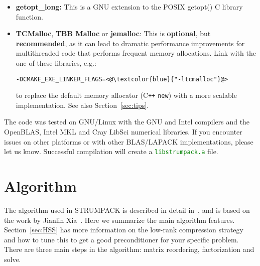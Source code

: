 \documentclass{article}
\newcommand{\tm}{\textsuperscript{\textregistered}}
\begin{document}
\begin{itemize}
\item \textbf{getopt\_long:} This is a GNU extension to the POSIX
  getopt() C library function.
\item \textbf{TCMalloc}, \textbf{TBB Malloc} or \textbf{jemalloc}:
  This is \textbf{optional}, but \textbf{recommended}, as it can lead
  to dramatic performance improvements for multithreaded code that
  performs frequent memory allocations. Link with the one of these
  libraries, e.g.:
  \begin{lstlisting}[style=Bash]
  -DCMAKE_EXE_LINKER_FLAGS=<@\textcolor{blue}{"-ltcmalloc"}@>
  \end{lstlisting}
  to replace the default memory allocator (C\texttt{++} \texttt{new})
  with a more scalable implementation. See also
  Section~\ref{sec:tips}.
\end{itemize}
The code was tested on GNU/Linux with the GNU and Intel\tm{} compilers
and the OpenBLAS, Intel\tm{} MKL\tm{} and Cray\tm{} LibSci\tm{}
numerical libraries. If you encounter issues on other platforms or
with other BLAS/LAPACK implementations, please let us know.
Successful compilation will create a
\textcolor{green}{\texttt{libstrumpack.a}} file.


\section{Algorithm}\label{sec:algo}
The algorithm used in STRUMPACK is described in detail
in~\cite{ghysels2015sparse}, and is based on the work by Jianlin
Xia~\cite{xia2013randomized}. Here we summarize the main algorithm
features. Section~\ref{sec:HSS} has more information on the low-rank
compression strategy and how to tune this to get a good preconditioner
for your specific problem. There are three main steps in the
algorithm: matrix reordering, factorization and solve.
\end{document}

